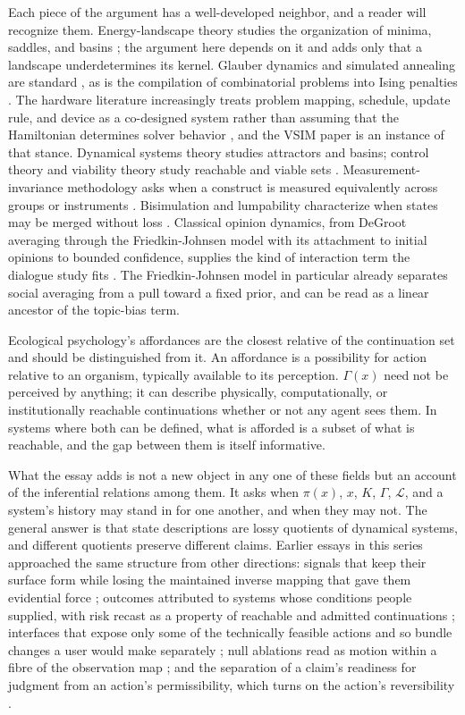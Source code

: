\documentclass[11pt]{article}
\theoremstyle{definition}
\theoremstyle{remark}
\begin{document}
Each piece of the argument has a well-developed neighbor, and a reader will recognize them. Energy-landscape theory studies the organization of minima, saddles, and basins \cite{wales2003}; the argument here depends on it and adds only that a landscape underdetermines its kernel. Glauber dynamics and simulated annealing are standard \cite{glauber1963,kirkpatrick1983}, as is the compilation of combinatorial problems into Ising penalties \cite{lucas2014}. The hardware literature increasingly treats problem mapping, schedule, update rule, and device as a co-designed system rather than assuming that the Hamiltonian determines solver behavior \cite{mohseni2022}, and the VSIM paper is an instance of that stance. Dynamical systems theory studies attractors and basins; control theory and viability theory study reachable and viable sets \cite{aubin1991}. Measurement-invariance methodology asks when a construct is measured equivalently across groups or instruments \cite{meredith1993}. Bisimulation and lumpability characterize when states may be merged without loss \cite{kemeny1960,larsen1991,givan2003}. Classical opinion dynamics, from DeGroot averaging through the Friedkin-Johnsen model with its attachment to initial opinions to bounded confidence, supplies the kind of interaction term the dialogue study fits \cite{degroot1974,friedkin1990,hegselmann2002}. The Friedkin-Johnsen model in particular already separates social averaging from a pull toward a fixed prior, and can be read as a linear ancestor of the topic-bias term.

Ecological psychology's affordances \cite{gibson1979} are the closest relative of the continuation set and should be distinguished from it. An affordance is a possibility for action relative to an organism, typically available to its perception. $\Gamma(x)$ need not be perceived by anything; it can describe physically, computationally, or institutionally reachable continuations whether or not any agent sees them. In systems where both can be defined, what is afforded is a subset of what is reachable, and the gap between them is itself informative.

What the essay adds is not a new object in any one of these fields but an account of the inferential relations among them. It asks when $\pi(x)$, $x$, $K$, $\Gamma$, $\mathcal{L}$, and a system's history may stand in for one another, and when they may not. The general answer is that state descriptions are lossy quotients of dynamical systems, and different quotients preserve different claims. Earlier essays in this series approached the same structure from other directions: signals that keep their surface form while losing the maintained inverse mapping that gave them evidential force \cite{flyxion-decoupling}; outcomes attributed to systems whose conditions people supplied, with risk recast as a property of reachable and admitted continuations \cite{flyxion-arranged}; interfaces that expose only some of the technically feasible actions and so bundle changes a user would make separately \cite{flyxion-adjacency}; null ablations read as motion within a fibre of the observation map \cite{flyxion-ablation}; and the separation of a claim's readiness for judgment from an action's permissibility, which turns on the action's reversibility \cite{flyxion-reversibility}.
\end{document}
